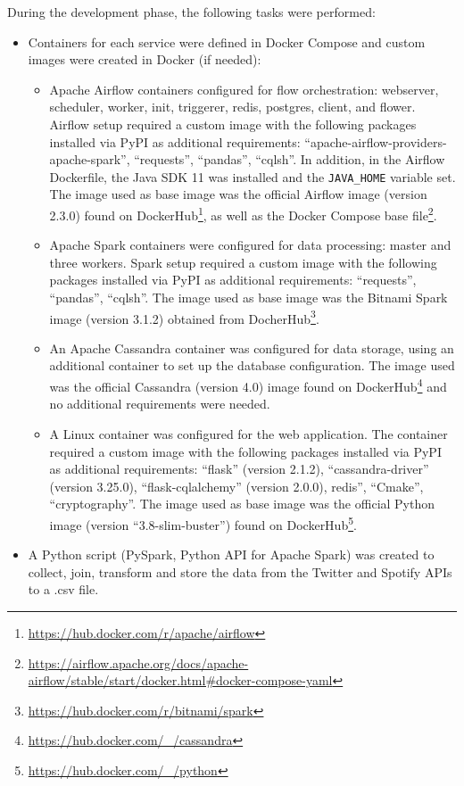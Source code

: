\nonzeroparskip During the development phase, the following tasks were performed:
\begin{itemize}
	\item Containers for each service were defined in Docker Compose and custom images were created in Docker (if needed):
	\begin{itemize}
		\item Apache Airflow containers configured for flow orchestration: webserver, scheduler, worker, init, triggerer, redis, postgres, client, and flower. Airflow setup required a custom image with the following packages installed via PyPI as additional requirements: ``apache-airflow-providers-apache-spark'', ``requests'', ``pandas'', ``cqlsh''. In addition, in the Airflow Dockerfile, the Java SDK 11 was installed and the \texttt{JAVA\_HOME} variable set. The image used as base image was the official Airflow image (version 2.3.0) found on DockerHub\footnote{\url{https://hub.docker.com/r/apache/airflow}}, as well as the Docker Compose base file\footnote{\url{https://airflow.apache.org/docs/apache-airflow/stable/start/docker.html\#docker-compose-yaml}}.
		\item Apache Spark containers were configured for data processing: master and three workers. Spark setup required a custom image with the following packages installed via PyPI as additional requirements: ``requests'', ``pandas'', ``cqlsh''. The image used as base image was the Bitnami Spark image (version 3.1.2) obtained from DocherHub\footnote{\url{https://hub.docker.com/r/bitnami/spark}}.
		\item An Apache Cassandra container was configured for data storage, using an additional container to set up the database configuration. The image used was the official Cassandra (version 4.0) image found on DockerHub\footnote{\url{https://hub.docker.com/_/cassandra}} and no additional requirements were needed.
		\item A Linux container was configured for the web application. The container required a custom image with the following packages installed via PyPI as additional requirements: ``flask'' (version 2.1.2), ``cassandra-driver'' (version 3.25.0), ``flask-cqlalchemy'' (version 2.0.0), redis'', ``Cmake'', ``cryptography''. The image used as base image was the official Python image (version ``3.8-slim-buster'') found on DockerHub\footnote{\url{https://hub.docker.com/_/python}}.
	\end{itemize}
	\item A Python script (PySpark, Python API for Apache Spark) was created to collect, join, transform and store the data from the Twitter and Spotify APIs to a .csv file.

\end{itemize}
